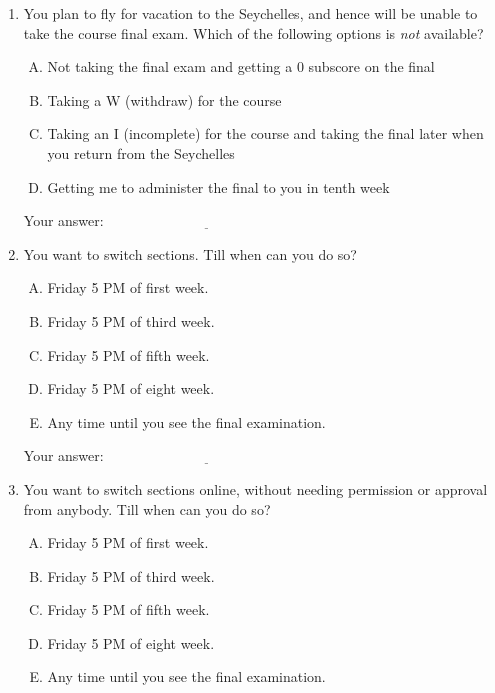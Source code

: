 \documentclass[10pt]{amsart}
\begin{document}
\begin{enumerate}
\item You plan to fly for vacation to the Seychelles, and hence will
  be unable to take the course final exam. Which of the following
  options is {\em not} available?

  \begin{enumerate}[(A)]
  \item Not taking the final exam and getting a $0$ subscore on the final
  \item Taking a W (withdraw) for the course
  \item Taking an I (incomplete) for the course and taking the final
    later when you return from the Seychelles
  \item Getting me to administer the final to you in tenth week
  \end{enumerate}

  \vspace{0.1in}
  Your answer: $\underline{\qquad\qquad\qquad\qquad\qquad\qquad\qquad}$
  \vspace{0.1in}

\item You want to switch sections. Till when can you do so?

  \begin{enumerate}[(A)]
  \item Friday 5 PM of first week.
  \item Friday 5 PM of third week.
  \item Friday 5 PM of fifth week.
  \item Friday 5 PM of eight week.
  \item Any time until you see the final examination.
  \end{enumerate}

  \vspace{0.1in}
  Your answer: $\underline{\qquad\qquad\qquad\qquad\qquad\qquad\qquad}$
  \vspace{0.1in}

\item You want to switch sections online, without needing permission
  or approval from anybody. Till when can you do so?

  \begin{enumerate}[(A)]
  \item Friday 5 PM of first week.
  \item Friday 5 PM of third week.
  \item Friday 5 PM of fifth week.
  \item Friday 5 PM of eight week.
  \item Any time until you see the final examination.
  \end{enumerate}


\end{enumerate}
\end{document}
